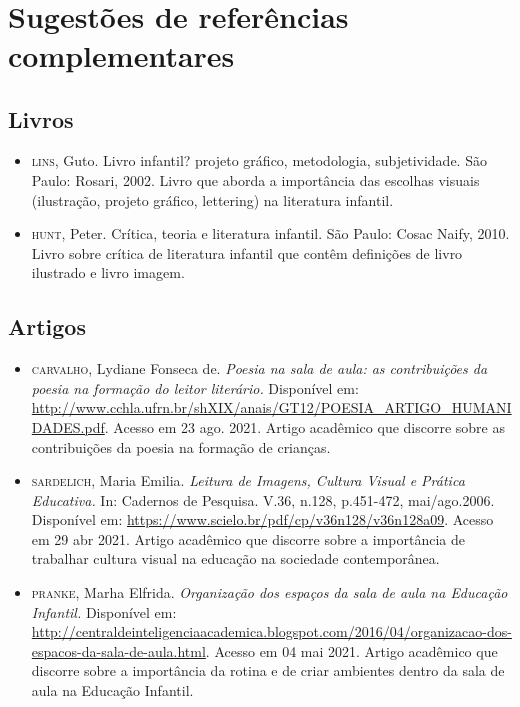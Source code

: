 \documentclass[11pt]{extarticle}
\begin{document}
 
\section{Sugestões de referências complementares}

\subsection{Livros} 

\begin{itemize}
\item \textsc{lins}, Guto. Livro infantil? projeto gráfico, metodologia, subjetividade. São Paulo: Rosari, 2002.
Livro que aborda a importância das escolhas visuais (ilustração, projeto gráfico, lettering) na literatura infantil.  

\item \textsc{hunt}, Peter. Crítica, teoria e literatura infantil. São Paulo: Cosac Naify, 2010.
Livro sobre crítica de literatura infantil que contêm definições de livro ilustrado e livro imagem. 
\end{itemize}

\subsection{Artigos}

\begin{itemize}

	\item \textsc{carvalho}, Lydiane Fonseca de. \emph{Poesia na sala de aula: as contribuições da poesia na formação
	do leitor literário.} Disponível em: \url{http://www.cchla.ufrn.br/shXIX/anais/GT12/POESIA_ARTIGO_HUMANIDADES.pdf}. Acesso em 23 ago. 2021.
	Artigo acadêmico que discorre sobre as contribuições da poesia na formação de crianças.
	\item \textsc{sardelich}, Maria Emilia. \emph{Leitura de Imagens, Cultura Visual e Prática Educativa.} 
In: Cadernos de Pesquisa. V.36, n.128, p.451-472, mai/ago.2006. Disponível em: \url{https://www.scielo.br/pdf/cp/v36n128/v36n128a09}. 
Acesso em 29 abr 2021. 
Artigo acadêmico que discorre sobre a importância de trabalhar cultura 
visual na educação na sociedade contemporânea. 

\item \textsc{pranke}, Marha Elfrida. \emph{Organização dos espaços da sala de aula na Educação Infantil.} Disponível em: 
\url{http://centraldeinteligenciaacademica.blogspot.com/2016/04/organizacao-dos-espacos-da-sala-de-aula.html}. Acesso em 04 mai 2021. 
Artigo acadêmico que discorre sobre a importância da rotina e de criar ambientes dentro da sala de aula na Educação Infantil.  
\end{itemize}
\end{document}
